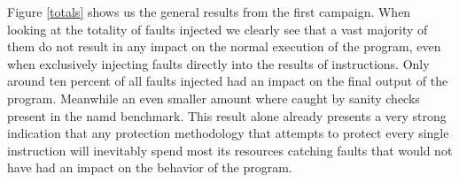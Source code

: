 \documentclass[lettersize,journal]{IEEEtran}
\begin{document}
Figure \ref{totals} shows us the general results from the first campaign. When looking at the totality of faults injected we clearly see that a vast majority of them do not result in any impact on the normal execution of the program, even when exclusively injecting faults directly into the results of instructions. Only around ten percent of all faults injected had an impact on the final output of the program. Meanwhile an even smaller amount where caught by sanity checks present in the namd benchmark. This result alone already presents a very strong indication that any protection methodology that attempts to protect every single instruction will inevitably spend most its resources catching faults that would not have had an impact on the behavior of the program.\\




\end{document}
